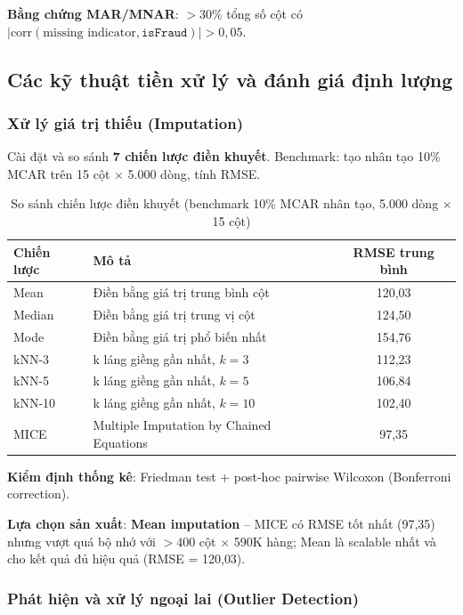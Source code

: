 \documentclass[12pt,a4paper]{article}
\let\oldtextbf\textbf
\renewcommand{\textbf}[1]{\oldtextbf{\textcolor{hcmublue}{#1}}}
\begin{document}
\textbf{Bằng chứng MAR/MNAR}: $>30\%$ tổng số cột có $|\text{corr}(\text{missing indicator}, \texttt{isFraud})| > 0{,}05$.

\subsection{Các kỹ thuật tiền xử lý và đánh giá định lượng}

\subsubsection{Xử lý giá trị thiếu (Imputation)}

Cài đặt và so sánh \textbf{7 chiến lược điền khuyết}. Benchmark: tạo nhân tạo 10\% MCAR trên 15 cột $\times$ 5.000 dòng, tính RMSE.

\begin{table}[H]
\centering
\begin{tabular}{|l|l|c|}
\hline
\textbf{Chiến lược} & \textbf{Mô tả} & \textbf{RMSE trung bình} \\ \hline
Mean         & Điền bằng giá trị trung bình cột & 120{,}03 \\ \hline
Median       & Điền bằng giá trị trung vị cột & 124{,}50 \\ \hline
Mode         & Điền bằng giá trị phổ biến nhất & 154{,}76 \\ \hline
kNN-3        & k láng giềng gần nhất, $k=3$ & 112{,}23 \\ \hline
kNN-5        & k láng giềng gần nhất, $k=5$ & 106{,}84 \\ \hline
kNN-10       & k láng giềng gần nhất, $k=10$ & 102{,}40 \\ \hline
MICE         & Multiple Imputation by Chained Equations & 97{,}35 \\ \hline
\end{tabular}
\caption{So sánh chiến lược điền khuyết (benchmark 10\% MCAR nhân tạo, 5.000 dòng $\times$ 15 cột)}
\label{tab:imputation_methods}
\end{table}

\textbf{Kiểm định thống kê}: Friedman test + post-hoc pairwise Wilcoxon (Bonferroni correction).

\textbf{Lựa chọn sản xuất}: \textbf{Mean imputation} -- MICE có RMSE tốt nhất (97{,}35) nhưng vượt quá bộ nhớ với $>400$ cột $\times$ 590K hàng; Mean là scalable nhất và cho kết quả đủ hiệu quả (RMSE = 120{,}03).

\subsubsection{Phát hiện và xử lý ngoại lai (Outlier Detection)}
\end{document}
